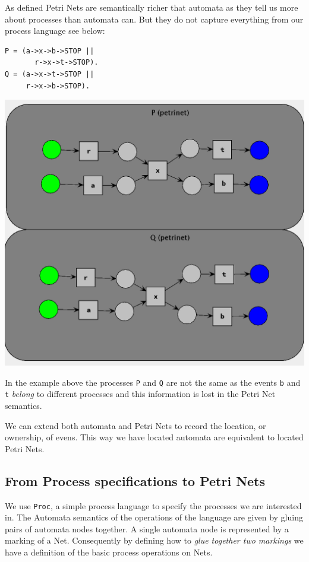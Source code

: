 \documentclass[]{article}
\begin{document}
As defined Petri Nets are semantically richer that automata as they tell us more about processes than automata can. But they do not capture everything from our process language see below:

\begin{minipage}{0.25\textwidth}
\begin{verbatim}
P = (a->x->b->STOP || 
       r->x->t->STOP).
Q = (a->x->t->STOP || 
     r->x->b->STOP).
  \end{verbatim}
\end{minipage}\begin{minipage}{0.7\textwidth}
\begin{center}\includegraphics[scale=0.4]{EquNets.png}\end{center}
\end{minipage}

In the example above the processes \verb|P| and \verb|Q| are not the same as the events \verb|b| and \verb|t| \emph{belong} to different processes and this information is lost in the Petri Net semantics.

We can extend both automata and Petri Nets to record the location, or ownership, of evens.  This way we have located automata are equivalent to located Petri Nets.

\subsection{From Process specifications to Petri Nets}
We use \verb|Proc|, a simple process language to specify the processes we are interested in. The Automata semantics of the operations of the language are given by gluing pairs of automata nodes together. A single automata node is represented by a marking of a Net.  Consequently by  defining how to \emph{glue together two markings} we have a definition of the basic process operations on Nets.
\end{document}
